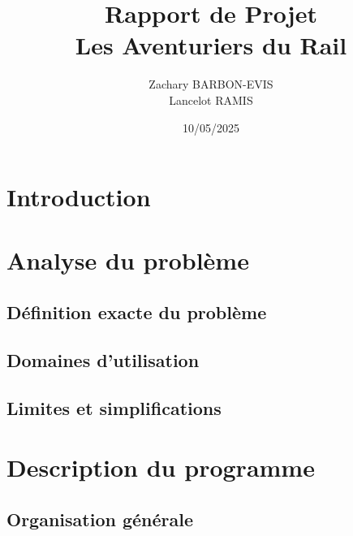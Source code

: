 \documentclass[a4paper,12pt]{report}
\title{Rapport de Projet \\ \textbf{Les Aventuriers du Rail}}
\author{Zachary BARBON-EVIS \\ Lancelot RAMIS}
\date{10/05/2025}
\begin{document}
\maketitle
\tableofcontents

\chapter*{Introduction}


\chapter{Analyse du problème}

\section{Définition exacte du problème}

\section{Domaines d’utilisation}

\section{Limites et simplifications}

\chapter{Description du programme}

\section{Organisation générale}
\end{document}
